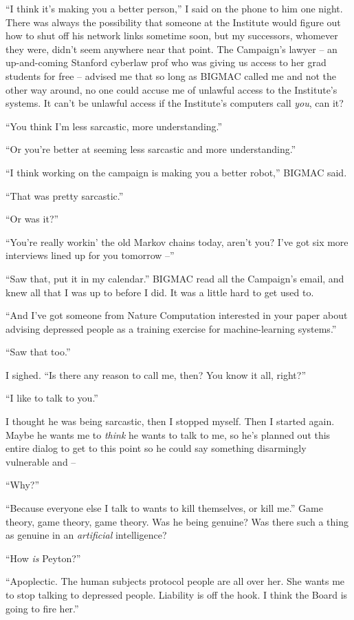 “I think it's making you a better person,” I said on the phone to 
him one night. There was always the possibility that someone at the 
Institute would figure out how to shut off his network links sometime 
soon, but my successors, whomever they were, didn't seem anywhere near 
that point. The Campaign's lawyer -- an up-and-coming Stanford cyberlaw 
prof who was giving us access to her grad students for free -- advised 
me that so long as BIGMAC called me and not the other way around, no 
one could accuse me of unlawful access to the Institute's systems. It 
can't be unlawful access if the Institute's computers call \emph{you}, 
can it?

“You think I'm less sarcastic, more understanding.”

“Or you're better at seeming less sarcastic and more understanding.”

“I think working on the campaign is making you a better robot,” 
BIGMAC said.

“That was pretty sarcastic.”

“Or was it?”

“You're really workin' the old Markov chains today, aren't you? I've 
got six more interviews lined up for you tomorrow --”

“Saw that, put it in my calendar.” BIGMAC read all the Campaign's 
email, and knew all that I was up to before I did. It was a little hard 
to get used to.

“And I've got someone from Nature Computation interested in your 
paper about advising depressed people as a training exercise for 
machine-learning systems.”

“Saw that too.”

I sighed. “Is there any reason to call me, then? You know it all, 
right?”

“I like to talk to you.”

I thought he was being sarcastic, then I stopped myself. Then I started 
again. Maybe he wants me to \emph{think} he wants to talk to me, so 
he's planned out this entire dialog to get to this point so he could 
say something disarmingly vulnerable and --

“Why?”

“Because everyone else I talk to wants to kill themselves, or kill 
me.” Game theory, game theory, game theory. Was he being genuine? Was 
there such a thing as genuine in an \emph{artificial} intelligence?

“How \emph{is} Peyton?”

“Apoplectic. The human subjects protocol people are all over her. She 
wants me to stop talking to depressed people. Liability is off the 
hook. I think the Board is going to fire her.”


